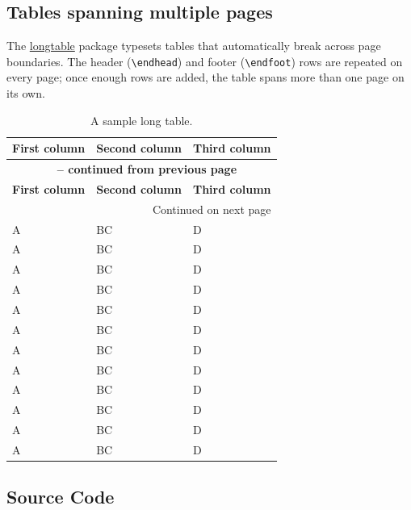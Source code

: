 \subsection{Tables spanning multiple pages}

The \href{https://ctan.org/pkg/longtable}{longtable} package typesets tables that automatically break across page boundaries.
The header (\verb+\endhead+) and footer (\verb+\endfoot+) rows are repeated on every page; once enough rows are added, the table spans more than one page on its own.

\begin{ltgexample}
\begin{longtable}{|l|l|l|}
  \caption{A sample long table.}\label{tab:long} \\
  \hline
  \multicolumn{1}{|c|}{\textbf{First column}} & \multicolumn{1}{c|}{\textbf{Second column}} & \multicolumn{1}{c|}{\textbf{Third column}} \\ \hline
  \endfirsthead

  \multicolumn{3}{c}{{\bfseries \tablename\ \thetable{} -- continued from previous page}} \\
  \hline
  \multicolumn{1}{|c|}{\textbf{First column}} & \multicolumn{1}{c|}{\textbf{Second column}} & \multicolumn{1}{c|}{\textbf{Third column}} \\ \hline
  \endhead

  \hline \multicolumn{3}{|r|}{{Continued on next page}} \\ \hline
  \endfoot

  \hline\hline
  \endlastfoot

  A & BC & D \\
  A & BC & D \\
  A & BC & D \\
  A & BC & D \\
  A & BC & D \\
  A & BC & D \\
  A & BC & D \\
  A & BC & D \\
  A & BC & D \\
  A & BC & D \\
  A & BC & D \\
  A & BC & D \\
\end{longtable}
\end{ltgexample}

\subsection{Source Code}

